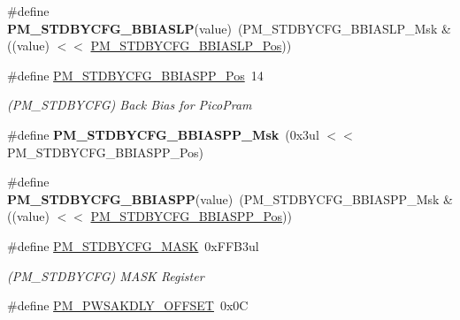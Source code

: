 \begin{DoxyCompactItemize}
\item 
\hypertarget{group___s_a_m_l21___p_m_ga03d33f51d5e2b1dc08cf88a7a1b03c3a}{}\#define {\bfseries P\+M\+\_\+\+S\+T\+D\+B\+Y\+C\+F\+G\+\_\+\+B\+B\+I\+A\+S\+L\+P}(value)~(P\+M\+\_\+\+S\+T\+D\+B\+Y\+C\+F\+G\+\_\+\+B\+B\+I\+A\+S\+L\+P\+\_\+\+Msk \& ((value) $<$$<$ \hyperlink{group___s_a_m_l21___p_m_gabe11f170a994b64f6e1cffc5aac98129}{P\+M\+\_\+\+S\+T\+D\+B\+Y\+C\+F\+G\+\_\+\+B\+B\+I\+A\+S\+L\+P\+\_\+\+Pos}))\label{group___s_a_m_l21___p_m_ga03d33f51d5e2b1dc08cf88a7a1b03c3a}

\item 
\hypertarget{group___s_a_m_l21___p_m_ga129c7a7c9fe17d9ddfb6303047279743}{}\#define \hyperlink{group___s_a_m_l21___p_m_ga129c7a7c9fe17d9ddfb6303047279743}{P\+M\+\_\+\+S\+T\+D\+B\+Y\+C\+F\+G\+\_\+\+B\+B\+I\+A\+S\+P\+P\+\_\+\+Pos}~14\label{group___s_a_m_l21___p_m_ga129c7a7c9fe17d9ddfb6303047279743}

\begin{DoxyCompactList}\small\item\em (P\+M\+\_\+\+S\+T\+D\+B\+Y\+C\+F\+G) Back Bias for Pico\+Pram \end{DoxyCompactList}\item 
\hypertarget{group___s_a_m_l21___p_m_ga61997c4fb8b94f83a11eb8ebe07ce178}{}\#define {\bfseries P\+M\+\_\+\+S\+T\+D\+B\+Y\+C\+F\+G\+\_\+\+B\+B\+I\+A\+S\+P\+P\+\_\+\+Msk}~(0x3ul $<$$<$ P\+M\+\_\+\+S\+T\+D\+B\+Y\+C\+F\+G\+\_\+\+B\+B\+I\+A\+S\+P\+P\+\_\+\+Pos)\label{group___s_a_m_l21___p_m_ga61997c4fb8b94f83a11eb8ebe07ce178}

\item 
\hypertarget{group___s_a_m_l21___p_m_gaa6efe96a6632bd77118cebd31b76caf1}{}\#define {\bfseries P\+M\+\_\+\+S\+T\+D\+B\+Y\+C\+F\+G\+\_\+\+B\+B\+I\+A\+S\+P\+P}(value)~(P\+M\+\_\+\+S\+T\+D\+B\+Y\+C\+F\+G\+\_\+\+B\+B\+I\+A\+S\+P\+P\+\_\+\+Msk \& ((value) $<$$<$ \hyperlink{group___s_a_m_l21___p_m_ga129c7a7c9fe17d9ddfb6303047279743}{P\+M\+\_\+\+S\+T\+D\+B\+Y\+C\+F\+G\+\_\+\+B\+B\+I\+A\+S\+P\+P\+\_\+\+Pos}))\label{group___s_a_m_l21___p_m_gaa6efe96a6632bd77118cebd31b76caf1}

\item 
\hypertarget{group___s_a_m_l21___p_m_ga9bbd6af7e430a29d33dbcebefe7d32d9}{}\#define \hyperlink{group___s_a_m_l21___p_m_ga9bbd6af7e430a29d33dbcebefe7d32d9}{P\+M\+\_\+\+S\+T\+D\+B\+Y\+C\+F\+G\+\_\+\+M\+A\+S\+K}~0x\+F\+F\+B3ul\label{group___s_a_m_l21___p_m_ga9bbd6af7e430a29d33dbcebefe7d32d9}

\begin{DoxyCompactList}\small\item\em (P\+M\+\_\+\+S\+T\+D\+B\+Y\+C\+F\+G) M\+A\+S\+K Register \end{DoxyCompactList}\item 
\hypertarget{group___s_a_m_l21___p_m_gabdbff3c9deb90644b518a60253972c5d}{}\#define \hyperlink{group___s_a_m_l21___p_m_gabdbff3c9deb90644b518a60253972c5d}{P\+M\+\_\+\+P\+W\+S\+A\+K\+D\+L\+Y\+\_\+\+O\+F\+F\+S\+E\+T}~0x0\+C\label{group___s_a_m_l21___p_m_gabdbff3c9deb90644b518a60253972c5d}


\end{DoxyCompactItemize}
